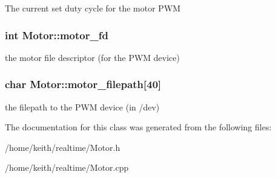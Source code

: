 The current set duty cycle for the motor P\-W\-M \hypertarget{classMotor_acb2ac1bd2630b05c40a64154a87ea65d}{
\subsubsection[{motor\-\_\-fd}]{\setlength{\rightskip}{0pt plus 5cm}int Motor\-::motor\-\_\-fd\hspace{0.3cm}{\ttfamily [protected]}}}\label{classMotor_acb2ac1bd2630b05c40a64154a87ea65d}
the motor file descriptor (for the P\-W\-M device) \hypertarget{classMotor_aed42ebef60a1374fc86dd2aff59af85e}{
\subsubsection[{motor\-\_\-filepath}]{\setlength{\rightskip}{0pt plus 5cm}char Motor\-::motor\-\_\-filepath\mbox{[}40\mbox{]}\hspace{0.3cm}{\ttfamily [protected]}}}\label{classMotor_aed42ebef60a1374fc86dd2aff59af85e}
the filepath to the P\-W\-M device (in /dev) 

The documentation for this class was generated from the following files\-:\begin{DoxyCompactItemize}
\item 
/home/keith/realtime/Motor.\-h\item 
/home/keith/realtime/Motor.\-cpp\end{DoxyCompactItemize}
